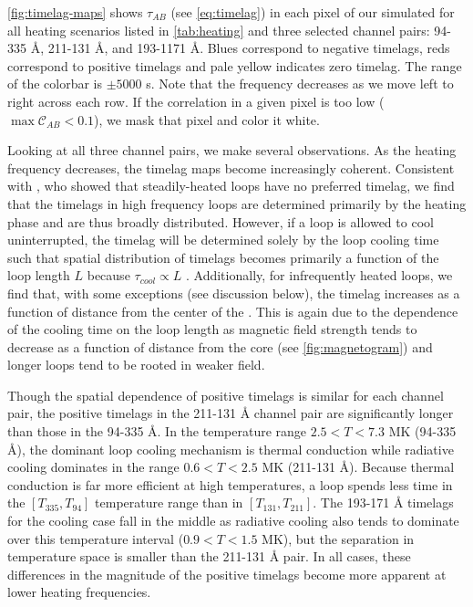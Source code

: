 \autoref{fig:timelag-maps} shows $\tau_{AB}$ (see \autoref{eq:timelag}) in each pixel of our simulated \AR{} for all heating scenarios listed in \autoref{tab:heating} and three selected channel pairs: 94-335 \AA{}, 211-131 \AA{}, and 193-1171 \AA{}. Blues correspond to negative timelags, reds correspond to positive timelags and pale yellow indicates zero timelag. The range of the colorbar is $\pm5000$ s. Note that the frequency decreases as we move left to right across each row. If the correlation in a given pixel is too low ($\max{\mathcal{C}_{AB}}<0.1$), we mask that pixel and color it white.

Looking at all three channel pairs, we make several observations. As the heating frequency decreases, the timelag maps become increasingly coherent. Consistent with \citet{viall_signatures_2016}, who showed that steadily-heated loops have no preferred timelag, we find that the timelags in high frequency loops are determined primarily by the heating phase and are thus broadly distributed. However, if a loop is allowed to cool uninterrupted, the timelag will be determined solely by the loop cooling time such that spatial distribution of timelags becomes primarily a function of the loop length $L$ because $\tau_{cool}\propto L$ \citep[see Appendix of][]{cargill_active_2014}. Additionally, for infrequently heated loops, we find that, with some exceptions (see discussion below), the timelag increases as a function of distance from the center of the \AR{}. This is again due to the dependence of the cooling time on the loop length as magnetic field strength tends to decrease as a function of distance from the core (see \autoref{fig:magnetogram}) and longer loops tend to be rooted in weaker field.

Though the spatial dependence of positive timelags is similar for each channel pair, the positive timelags in the 211-131 \AA{} channel pair are significantly longer than those in the 94-335 \AA{}. In the temperature range $2.5<T<7.3$ MK (94-335 \AA{}), the dominant loop cooling mechanism is thermal conduction while radiative cooling dominates in the range $0.6<T<2.5$ MK (211-131 \AA{}). Because thermal conduction is far more efficient at high temperatures, a loop spends less time in the $[T_{335},T_{94}]$ temperature range than in $[T_{131},T_{211}]$. The 193-171 \AA{} timelags for the cooling case fall in the middle as radiative cooling also tends to dominate over this temperature interval ($0.9<T<1.5$ MK), but the separation in temperature space is smaller than the 211-131 \AA{} pair. In all cases, these differences in the magnitude of the positive timelags become more apparent at lower heating frequencies.


